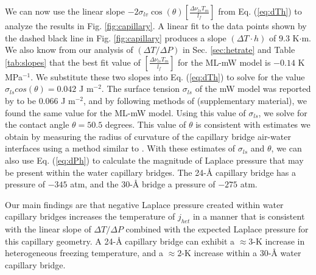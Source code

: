 \documentclass[journal abbreviation, manuscript]{copernicus}
\begin{document}
We can now use the linear slope $-2 \sigma_{lv}\cos(\theta) \left[\frac{\Delta \nu_{ls} T_m }{l_f}\right]$ from Eq. (\ref{eq:dTh}) to analyze the results in Fig. \ref{fig:capillary}. A linear fit to the data points shown by the dashed black line in Fig. \ref{fig:capillary} produces a slope $(\Delta T \cdot h)$ of $9.3$ K$\cdot$m. We also know from our analysis of $(\Delta T/\Delta P)$ in Sec. \ref{sec:hetrate} and Table \ref{tab:slopes} that the best fit value of $\left[\frac{\Delta \nu_{ls} T_m }{l_f}\right]$ for the ML-mW model is $-0.14$ K MPa$^{-1}$. We substitute these two slopes into Eq. (\ref{eq:dTh}) to solve for the value $\sigma_{ls} cos(\theta) = 0.042$ J m$^{-2}$. The surface tension $\sigma_{ls}$ of the mW model was reported by \citet{molinero2009} to be $0.066$ J m$^{-2}$, and by following methods of \citet{li2009surface} (supplementary material), we found the same value for the ML-mW model. Using this value of $\sigma_{ls}$, we solve for the contact angle $\theta = 50.5$ degrees. This value of $\theta$ is consistent with estimates we obtain by measuring the radius of curvature of the capillary bridge air-water interfaces using a method similar to \citet{giovambattista2007}. With these estimates of $\sigma_{ls}$ and $\theta$, we can also use Eq. (\ref{eq:dPh}) to calculate the magnitude of Laplace pressure that may be present within the water capillary bridges. The 24-\AA{} capillary bridge has a pressure of $-345$ atm, and the 30-\AA{} bridge a pressure of $-275$ atm.

Our main findings are that negative Laplace pressure created within water capillary bridges increases the temperature of $j_{het}$ in a manner that is consistent with the linear slope of $\Delta T/\Delta P$ combined with the expected Laplace pressure for this capillary geometry. A 24-\AA{} capillary bridge can exhibit a $\approx 3$-K increase in heterogeneous freezing temperature, and a $\approx 2$-K increase within a 30-\AA{} water capillary bridge.
\end{document}
